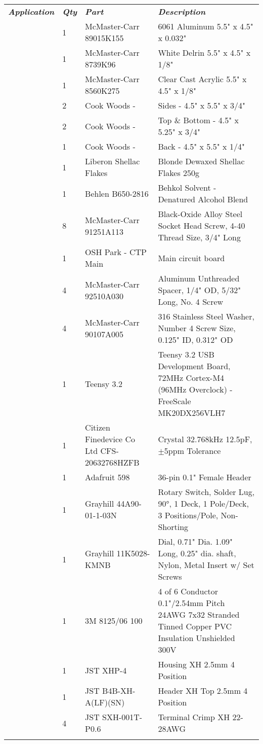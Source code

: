 \tiny
{}
\begin{longtabu}{X[3,c,m] X[1,c,m] X[3,c,m] X[5,l,m]}
  \thrule
  \textit{\bfseries\normalsize Application} & \textit{\bfseries\normalsize Qty} & \textit{\bfseries\normalsize Part} & \textit{\bfseries\normalsize Description} \\ \mrule

   & 1 & McMaster-Carr 89015K155 & 6061 Aluminum 5.5" x 4.5" x 0.032" \\
  & 1 & McMaster-Carr 8739K96 & White Delrin 5.5" x 4.5" x 1/8" \\
  & 1 & McMaster-Carr 8560K275 & Clear Cast Acrylic 5.5" x 4.5" x 1/8" \\
  & 2 & Cook Woods - \wood{} & Sides - 4.5" x 5.5" x 3/4" \\
  & 2 & Cook Woods - \wood{} & Top \& Bottom - 4.5" x 5.25" x 3/4" \\
  & 1 & Cook Woods - \wood{} & Back - 4.5" x 5.5" x 1/4" \\
  & 1 & Liberon Shellac Flakes & Blonde Dewaxed Shellac Flakes 250g \\
  & 1 & Behlen B650-2816 & Behkol Solvent - Denatured Alcohol Blend \\
  & 8 & McMaster-Carr 91251A113 & Black-Oxide Alloy Steel Socket Head Screw, 4-40 Thread Size, 3/4" Long \\ \mrule

   & 1 & OSH Park - CTP Main & Main circuit board \\
  & 4 & McMaster-Carr 92510A030 & Aluminum Unthreaded Spacer, 1/4" OD, 5/32" Long, No. 4 Screw \\
  & 4 & McMaster-Carr 90107A005 & 316 Stainless Steel Washer, Number 4 Screw Size, 0.125" ID, 0.312" OD \\ \mrule

   & 1 & Teensy 3.2 & Teensy 3.2 USB Development Board, 72MHz Cortex-M4 (96MHz Overclock) - FreeScale MK20DX256VLH7 \\
  & 1 & Citizen Finedevice Co Ltd CFS-20632768HZFB & Crystal 32.768kHz 12.5pF, $\pm$5ppm Tolerance \\
  & 1 & Adafruit 598 & 36-pin 0.1" Female Header \\ \mrule

   & 1 & Grayhill 44A90-01-1-03N & Rotary Switch, Solder Lug, 90°, 1 Deck, 1 Pole/Deck, 3 Positions/Pole, Non-Shorting \\
  & 1 & Grayhill 11K5028-KMNB & Dial, 0.71" Dia. 1.09" Long, 0.25" dia. shaft, Nylon, Metal Insert w/ Set Screws \\
  & 1 & 3M 8125/06 100 & 4 of 6 Conductor 0.1"/2.54mm Pitch 24AWG 7x32 Stranded Tinned Copper PVC Insulation Unshielded 300V \\
  & 1 & JST XHP-4 & Housing XH 2.5mm 4 Position \\
  & 1 & JST B4B-XH-A(LF)(SN) & Header XH Top 2.5mm 4 Position \\
  & 4 & JST SXH-001T-P0.6 & Terminal Crimp XH 22-28AWG \\ \mrule


\end{longtabu}
